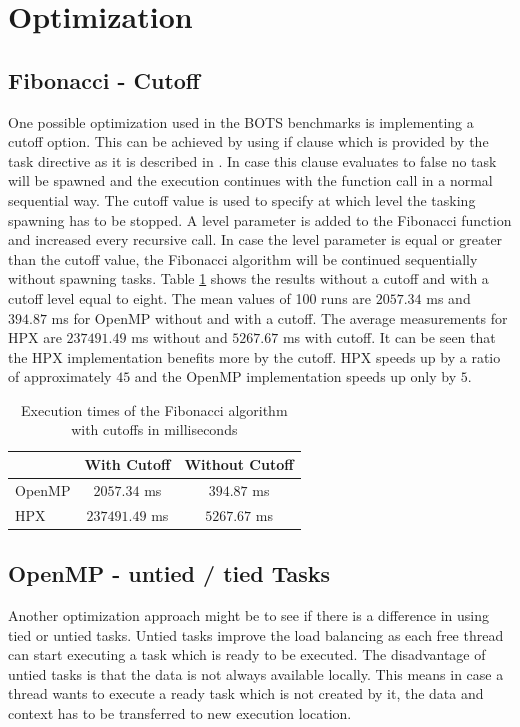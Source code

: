 \section{Optimization}
\label{sec:Opt}
\subsection{Fibonacci - Cutoff}
  One possible optimization used in the BOTS benchmarks is implementing a cutoff option.
  This can be achieved by using if clause which is provided by the task directive as it is described in \cite{MKlemm.2018}.
  In case this clause evaluates to false no task will be spawned and the execution continues with the function call in a normal sequential way.
  The cutoff value is used to specify at which level the tasking spawning has to be stopped.
  A level parameter is added to the Fibonacci function and increased every recursive call.
  In case the level parameter is equal or greater than the cutoff value, the Fibonacci algorithm will be continued sequentially without spawning tasks. 
  Table \ref{tab:cutoff} shows the results without a cutoff and with a cutoff level equal to eight.
  The mean values of 100 runs are \(2057.34\) ms and \(394.87\) ms for OpenMP without and with a cutoff.
The average measurements for HPX are \(237491.49\) ms without and \(5267.67\) ms with cutoff.
It can be seen that the HPX implementation benefits more by the cutoff.
HPX speeds up by a ratio of approximately \(45\) and the OpenMP implementation speeds up only by \(5\).

\begin{table}
\centering
\caption{Execution times of the Fibonacci algorithm with cutoffs in milliseconds}
\begin{tabular}[h]{|l|c|c|}
\hline
 & With Cutoff & Without Cutoff \\\hline
OpenMP & \(2057.34\) ms & \(394.87\) ms \\\hline
HPX & \(237491.49\) ms & \(5267.67\) ms \\\hline
\end{tabular}
\label{tab:cutoff}
\end{table}

\subsection{OpenMP - untied / tied Tasks}
  Another optimization approach might be to see if there is a difference in using tied or untied tasks.
  Untied tasks improve the load balancing as each free thread can start executing a task which is ready to be executed.
  The disadvantage of untied tasks is that the data is not always available locally.
  This means in case a thread wants to execute a ready task which is not created by it, the data and context has to be transferred to new execution location.
  
